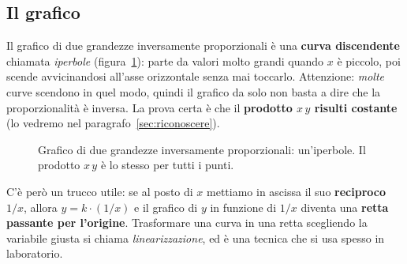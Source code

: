 \subsection{Il grafico}
Il grafico di due grandezze inversamente proporzionali è una \textbf{curva discendente} chiamata \emph{iperbole} (figura~\ref{fig:rel-inversa}): parte da valori molto grandi quando $x$ è piccolo, poi scende avvicinandosi all'asse orizzontale senza mai toccarlo. Attenzione: \emph{molte} curve scendono in quel modo, quindi il grafico da solo non basta a dire che la proporzionalità è inversa. La prova certa è che il \textbf{prodotto $x\,y$ risulti costante} (lo vedremo nel paragrafo~\ref{sec:riconoscere}).

\begin{figure}[!htbp]
    \centering
    \caption{Grafico di due grandezze inversamente proporzionali: un'iperbole. Il prodotto $x\,y$ è lo stesso per tutti i punti.}
    \label{fig:rel-inversa}
\end{figure}

C'è però un trucco utile: se al posto di $x$ mettiamo in ascissa il suo \textbf{reciproco} $1/x$, allora $y = k\cdot(1/x)$ e il grafico di $y$ in funzione di $1/x$ diventa una \textbf{retta passante per l'origine}. Trasformare una curva in una retta scegliendo la variabile giusta si chiama \emph{linearizzazione}, ed è una tecnica che si usa spesso in laboratorio.

